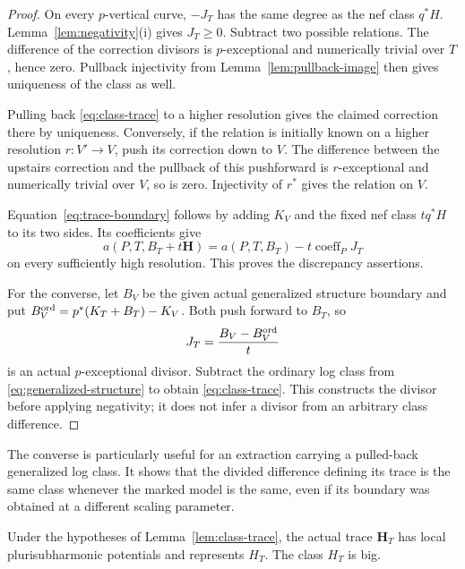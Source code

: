 \begin{proof}
On every $p$-vertical curve, $-J_T$ has the same degree as the nef
class $q^*H$.  Lemma~\ref{lem:negativity}(i) gives $J_T\geq0$.
Subtract two possible relations.  The difference of the correction
divisors is $p$-exceptional and numerically trivial over $T$, hence
zero.  Pullback injectivity from Lemma~\ref{lem:pullback-image} then
gives uniqueness of the class as well.

Pulling back \eqref{eq:class-trace} to a higher resolution gives the
claimed correction there by uniqueness.  Conversely, if the relation
is initially known on a higher resolution $r:V'\to V$, push its
correction down to $V$.  The difference between the upstairs
correction and the pullback of this pushforward is $r$-exceptional
and numerically trivial over $V$, so is zero.  Injectivity of $r^*$
gives the relation on $V$.

Equation~\eqref{eq:trace-boundary} follows by adding $K_V$ and the
fixed nef class $tq^*H$ to its two sides.  Its coefficients give
\[
 a(P,T,B_T+t\mathbf H)
 =a(P,T,B_T)-t\operatorname{coeff}_P J_T
\]
on every sufficiently high resolution.  This proves the discrepancy
assertions.

For the converse, let $B_V$ be the given actual generalized structure
boundary and put $B_V^{\rm ord}=p^*(K_T+B_T)-K_V$.  Both push forward
to $B_T$, so
\[
 J_T=\frac{B_V-B_V^{\rm ord}}{t}
\]
is an actual $p$-exceptional divisor.  Subtract the ordinary log class
from \eqref{eq:generalized-structure} to obtain
\eqref{eq:class-trace}.  This constructs the divisor before applying
negativity; it does not infer a divisor from an arbitrary class
difference.
\end{proof}

The converse is particularly useful for an extraction carrying a
pulled-back generalized log class.  It shows that the divided
difference defining its trace is the same class whenever the marked
model is the same, even if its boundary was obtained at a different
scaling parameter.

\begin{corollary}\label{cor:big-trace}
Under the hypotheses of Lemma~\ref{lem:class-trace}, the actual trace
$\mathbf H_T$ has local plurisubharmonic potentials and represents
$H_T$.  The class $H_T$ is big.
\end{corollary}

